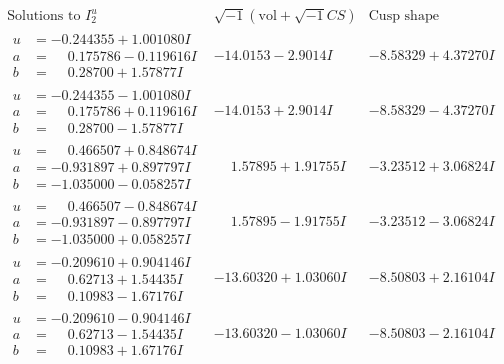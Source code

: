 \documentclass[1p]{elsarticle_modified}
\theoremstyle{definition}
\newcommand{\I}{\sqrt{-1}}
\begin{document}
$$\begin{array}{c|c|c}  
\text{Solutions to }I^u_{2}& \I (\text{vol} + \sqrt{-1}CS) & \text{Cusp shape}\\
 \hline 
\begin{aligned}
u &= -0.244355 + 1.001080 I \\
a &= \phantom{-}0.175786 - 0.119616 I \\
b &= \phantom{-}0.28700 + 1.57877 I\end{aligned}
 & -14.0153 - 2.9014 I & -8.58329 + 4.37270 I \\ \hline\begin{aligned}
u &= -0.244355 - 1.001080 I \\
a &= \phantom{-}0.175786 + 0.119616 I \\
b &= \phantom{-}0.28700 - 1.57877 I\end{aligned}
 & -14.0153 + 2.9014 I & -8.58329 - 4.37270 I \\ \hline\begin{aligned}
u &= \phantom{-}0.466507 + 0.848674 I \\
a &= -0.931897 + 0.897797 I \\
b &= -1.035000 - 0.058257 I\end{aligned}
 & \phantom{-}1.57895 + 1.91755 I & -3.23512 + 3.06824 I \\ \hline\begin{aligned}
u &= \phantom{-}0.466507 - 0.848674 I \\
a &= -0.931897 - 0.897797 I \\
b &= -1.035000 + 0.058257 I\end{aligned}
 & \phantom{-}1.57895 - 1.91755 I & -3.23512 - 3.06824 I \\ \hline\begin{aligned}
u &= -0.209610 + 0.904146 I \\
a &= \phantom{-}0.62713 + 1.54435 I \\
b &= \phantom{-}0.10983 - 1.67176 I\end{aligned}
 & -13.60320 + 1.03060 I & -8.50803 + 2.16104 I \\ \hline\begin{aligned}
u &= -0.209610 - 0.904146 I \\
a &= \phantom{-}0.62713 - 1.54435 I \\
b &= \phantom{-}0.10983 + 1.67176 I\end{aligned}
 & -13.60320 - 1.03060 I & -8.50803 - 2.16104 I \\ \hline\begin{aligned}

\end{aligned}
\end{array}$$
\end{document}
